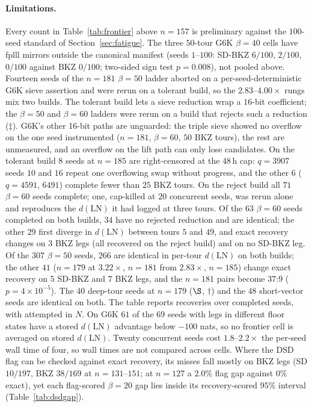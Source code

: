 \documentclass[journal=cic,version=preprint]{iacrj}
\begin{document}
\paragraph{Limitations.}
Every count in Table~\ref{tab:frontier} above $n=157$ is preliminary against the
$100$-seed standard of Section~\ref{sec:fatigue}. The three $50$-tour G6K
$\beta=40$ cells have fplll mirrors outside the canonical manifest (seeds
$1$--$100$: SD-BKZ $6/100$, $2/100$, $0/100$ against BKZ $0/100$; two-sided
sign test $p=0.008$), not pooled above. Fourteen seeds
of the $n=181$ $\beta=50$ ladder aborted on a per-seed-deterministic G6K
sieve assertion and were rerun on a tolerant build, so the
$2.83$--$4.00\times$ rungs mix two builds. The tolerant build lets a sieve
reduction wrap a $16$-bit coefficient; the $\beta=50$ and $\beta=60$ ladders were rerun on a
build that rejects such a reduction ($\ddagger$). G6K's other 16-bit paths
are unguarded: the triple sieve showed no overflow on the one seed
instrumented ($n=181$, $\beta=60$, $50$ BKZ tours), the rest are unmeasured,
and an overflow on the lift path can only lose candidates. On the tolerant build $8$
seeds at $n=185$ are right-censored at the $48$\,h cap: $q=3907$ seeds $10$
and $16$ repeat one overflowing swap without progress, and the other $6$
($q=4591$, $6491$) complete fewer than $25$ BKZ tours. On the reject build
all $71$ $\beta=60$ seeds complete; one, cap-killed at $20$ concurrent seeds, was rerun
alone and reproduces the $d(\mathrm{LN})$ it had logged at three tours. Of the $63$ $\beta=60$ seeds completed on both builds,
$34$ have no rejected reduction and are identical; the other $29$ first diverge
in $d(\mathrm{LN})$ between tours $5$ and $49$, and exact recovery changes on $3$
BKZ legs (all recovered on the reject build) and on no SD-BKZ leg. Of the $307$
$\beta=50$ seeds, $266$ are identical in per-tour $d(\mathrm{LN})$ on both builds; the other $41$
($n=179$ at $3.22\times$, $n=181$ from $2.83\times$, $n=185$) change exact recovery on $5$ SD-BKZ
and $7$ BKZ legs, and the $n=181$ pairs become $37$:$9$ ($p=4\times10^{-5}$). The $40$
deep-tour seeds at $n=179$ ($\S$, $\dagger$) and the $48$ short-vector seeds are identical on both. The table
reports recoveries over completed seeds, with attempted in $N$. On G6K
$61$ of the $69$ seeds with legs in different floor states have a stored
$d(\mathrm{LN})$ advantage below $-100$ nats, so no frontier cell is averaged on stored
$d(\mathrm{LN})$. Twenty concurrent seeds cost $1.8$--$2.2\times$ the
per-seed wall time of four, so wall times are not compared across cells.
Where the DSD flag can be checked against exact recovery, its misses fall
mostly on BKZ legs (SD $10/197$, BKZ $38/169$ at $n=131$--$151$; at $n=127$
a $2.0\%$ flag gap against $0\%$ exact), yet each flag-scored $\beta=20$
gap lies inside its recovery-scored $95\%$ interval (Table~\ref{tab:dsdgap}).
\end{document}
